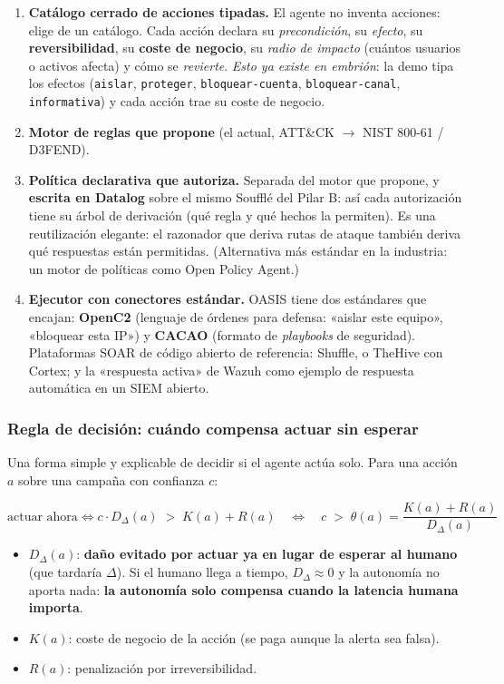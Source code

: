 \documentclass[11pt,a4paper]{article}
\newcommand{\cod}[1]{\texttt{#1}}
\newcommand{\flecha}{$\rightarrow$}
\begin{document}
\begin{enumerate}
  \item \textbf{Catálogo cerrado de acciones tipadas.} El agente no inventa acciones: elige de un catálogo. Cada
        acción declara su \textit{precondición}, su \textit{efecto}, su \textbf{reversibilidad}, su \textbf{coste de
        negocio}, su \textit{radio de impacto} (cuántos usuarios o activos afecta) y cómo se \textit{revierte}.
        \textit{Esto ya existe en embrión}: la demo tipa los efectos (\cod{aislar}, \cod{proteger},
        \cod{bloquear-cuenta}, \cod{bloquear-canal}, \cod{informativa}) y cada acción trae su coste de negocio.
  \item \textbf{Motor de reglas que propone} (el actual, ATT\&CK \flecha{} NIST 800-61 / D3FEND).
  \item \textbf{Política declarativa que autoriza.} Separada del motor que propone, y \textbf{escrita en
        Datalog} sobre el mismo Soufflé del Pilar B: así cada autorización tiene su árbol de derivación (qué regla
        y qué hechos la permiten). Es una reutilización elegante: el razonador que deriva rutas de ataque también
        deriva qué respuestas están permitidas. (Alternativa más estándar en la industria: un motor de políticas
        como Open Policy Agent.)
  \item \textbf{Ejecutor con conectores estándar.} OASIS tiene dos estándares que encajan: \textbf{OpenC2}
        (lenguaje de órdenes para defensa: «aislar este equipo», «bloquear esta IP») y \textbf{CACAO}
        (formato de \textit{playbooks} de seguridad). Plataformas SOAR de código abierto de referencia:
        Shuffle, o TheHive con Cortex; y la «respuesta activa» de Wazuh como ejemplo de respuesta automática en un
        SIEM abierto.
\end{enumerate}

\subsubsection*{Regla de decisión: cuándo compensa actuar sin esperar}

Una forma simple y explicable de decidir si el agente actúa solo. Para una acción $a$ sobre una campaña con
confianza $c$:

\[
\text{actuar ahora} \iff c \cdot D_{\Delta}(a) \;>\; K(a) + R(a)
\quad\Longleftrightarrow\quad
c \;>\; \theta(a) = \frac{K(a) + R(a)}{D_{\Delta}(a)}
\]

\begin{itemize}
  \item $D_{\Delta}(a)$: \textbf{daño evitado por actuar ya en lugar de esperar al humano} (que tardaría $\Delta$).
        Si el humano llega a tiempo, $D_\Delta \approx 0$ y la autonomía no aporta nada: \textbf{la autonomía solo
        compensa cuando la latencia humana importa}.
  \item $K(a)$: coste de negocio de la acción (se paga aunque la alerta sea falsa).
  \item $R(a)$: penalización por irreversibilidad.
\end{itemize}
\end{document}
